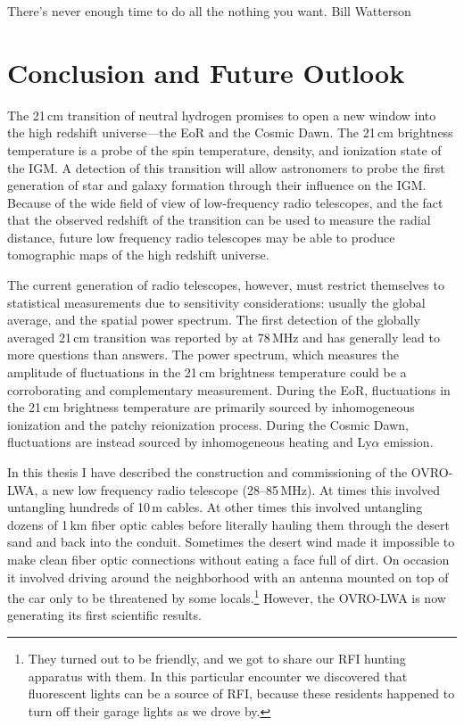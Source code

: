 \cleartoevenpage

\myepigraph
{There's never enough time to do all the nothing you want.}
{Bill Watterson}

\chapter{Conclusion and Future Outlook}
\label{chapter5}

\begin{bibunit}

The 21\,cm transition of neutral hydrogen promises to open a new window into the high redshift
universe---the EoR and the Cosmic Dawn. The 21\,cm brightness temperature is a probe of the spin
temperature, density, and ionization state of the IGM.  A detection of this transition will allow
astronomers to probe the first generation of star and galaxy formation through their influence on
the IGM. Because of the wide field of view of low-frequency radio telescopes, and the fact that the
observed redshift of the transition can be used to measure the radial distance, future low frequency
radio telescopes may be able to produce tomographic maps of the high redshift universe.

The current generation of radio telescopes, however, must restrict themselves to statistical
measurements due to sensitivity considerations: usually the global average, and the spatial power
spectrum. The first detection of the globally averaged 21\,cm transition was reported by
\citet{2018Natur.555...67B} at 78\,MHz and has generally lead to more questions than answers. The
power spectrum, which measures the amplitude of fluctuations in the 21\,cm brightness temperature
could be a corroborating and complementary measurement.  During the EoR, fluctuations in the 21\,cm
brightness temperature are primarily sourced by inhomogeneous ionization and the patchy reionization
process.  During the Cosmic Dawn, fluctuations are instead sourced by inhomogeneous heating and
Ly$\alpha$ emission.

In this thesis I have described the construction and commissioning of the OVRO-LWA, a new low
frequency radio telescope (28--85\,MHz).  At times this involved untangling hundreds of 10\,m
cables. At other times this involved untangling dozens of 1\,km fiber optic cables before literally
hauling them through the desert sand and back into the conduit.  Sometimes the desert wind made it
impossible to make clean fiber optic connections without eating a face full of dirt. On occasion it
involved driving around the neighborhood with an antenna mounted on top of the car only to be
threatened by some locals.\footnote{
    They turned out to be friendly, and we got to share our RFI hunting apparatus with them. In this
    particular encounter we discovered that fluorescent lights can be a source of RFI, because these
    residents happened to turn off their garage lights as we drove by.
}
However, the OVRO-LWA is now generating its first scientific results.


\end{bibunit}
